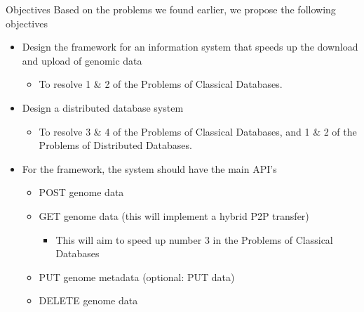 \documentclass{beamer}
\begin{document}
\begin{frame}{Objectives}
Based on the problems we found earlier, we propose the following objectives
\begin{itemize}
    \item Design the framework for an information system that speeds up the download and upload of genomic data
    \begin{itemize} 
        \item To resolve 1 \& 2 of the Problems of Classical Databases. 
    \end{itemize}
    \item  Design a distributed database system
    \begin{itemize}
        \item To resolve 3 \& 4 of the Problems of Classical Databases, and 1 \& 2 of the Problems of Distributed Databases. 
    \end{itemize}
\end{itemize}

\begin{itemize}
    \item For the framework, the system should have the main API’s 
    \begin{itemize}
        \item POST genome data
        \item GET genome data (this will implement a hybrid P2P transfer)
        \begin{itemize}
            \item This will aim to speed up number 3 in the Problems of Classical Databases
        \end{itemize}
        \item PUT genome metadata (optional: PUT data)
        \item DELETE genome data
    \end{itemize}
\end{itemize}
\end{frame}
\end{document}
